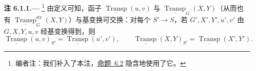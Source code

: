 \medskip
{}\label{rem:sga3-VIB-6.1.1}%
\noindent\textbf{注 6.1.1.---}%
\footnote{\label{note:sga3-VIB-50}编者注：我们补入了本注，\hyperref[prop:sga3-VIB-6.2]{命题~6.2} 隐含地使用了它。}
由定义可知，函子
\(\underline{\operatorname{Transp}}(u,v)\) 与
\(\underline{\operatorname{Transp}}_G(X,Y)\)（从而也有
\(\underline{\operatorname{Transp}}^{\mathrm{str}}_G(X,Y)\)）与基变换可交换：对每个 \(S'\to S\)，若
\(G',X',Y',u',v'\) 由 \(G,X,Y,u,v\) 经基变换得到，则
\label{eq:sga3-VIB-6.1.1-base-change}%
\[
\underline{\operatorname{Transp}}(u,v)_{S'}
  =\underline{\operatorname{Transp}}(u',v'),
\qquad
\underline{\operatorname{Transp}}(X,Y)_{S'}
  =\underline{\operatorname{Transp}}(X',Y').
\]

